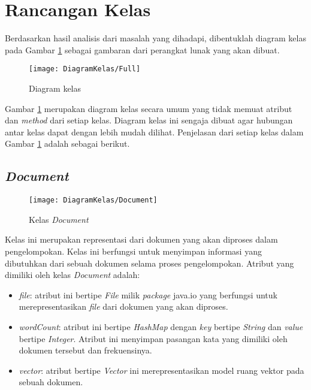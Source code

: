 \section{Rancangan Kelas}
Berdasarkan hasil analisis dari masalah yang dihadapi, dibentuklah diagram kelas pada Gambar \ref{fig:diagramkelas} sebagai gambaran dari perangkat lunak yang akan dibuat.

\begin{figure}[H]
	\begin{center}
		\texttt{[image: DiagramKelas/Full]}
		\caption{Diagram kelas}
		\label{fig:diagramkelas}
	\end{center}
\end{figure}

Gambar \ref{fig:diagramkelas} merupakan diagram kelas secara umum yang tidak memuat atribut dan \textit{method} dari setiap kelas. Diagram kelas ini sengaja dibuat agar hubungan antar kelas dapat dengan lebih mudah dilihat. Penjelasan dari setiap kelas dalam Gambar \ref{fig:diagramkelas} adalah sebagai berikut.

\subsection{\textit{Document}}

\begin{figure}[H]
	\begin{center}
		\texttt{[image: DiagramKelas/Document]}
		\caption{Kelas \textit{Document}}
		\label{fig:kelasDocument}
	\end{center}
\end{figure}

Kelas ini merupakan representasi dari dokumen yang akan diproses dalam pengelompokan. Kelas ini berfungsi untuk menyimpan informasi yang dibutuhkan dari sebuah dokumen selama proses pengelompokan. Atribut yang dimiliki oleh kelas \textit{Document} adalah:

\begin{itemize}
	\item \textit{file}: atribut ini bertipe \textit{File} milik \textit{package} java.io yang berfungsi untuk merepresentasikan \textit{file} dari dokumen yang akan diproses.
	\item \textit{wordCount}: atribut ini bertipe \textit{HashMap} dengan \textit{key} bertipe \textit{String} dan \textit{value} bertipe \textit{Integer}. Atribut ini menyimpan pasangan kata yang dimiliki oleh dokumen tersebut dan frekuensinya.
	\item \textit{vector}: atribut bertipe \textit{Vector} ini merepresentasikan model ruang vektor pada sebuah dokumen.
\end{itemize}

